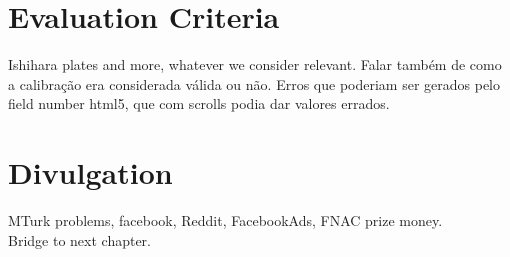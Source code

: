 \section{Evaluation Criteria}
\label{sec:impl_evaluationcriteria}
Ishihara plates and more, whatever we consider relevant. Falar também de como a calibração era considerada válida ou não. Erros
que poderiam ser gerados pelo field number html5, que com scrolls podia dar valores errados. \\

\section{Divulgation}
\label{sec:impl_divulgation}
MTurk problems, facebook, Reddit, FacebookAds, FNAC prize money. \\

Bridge to next chapter.

